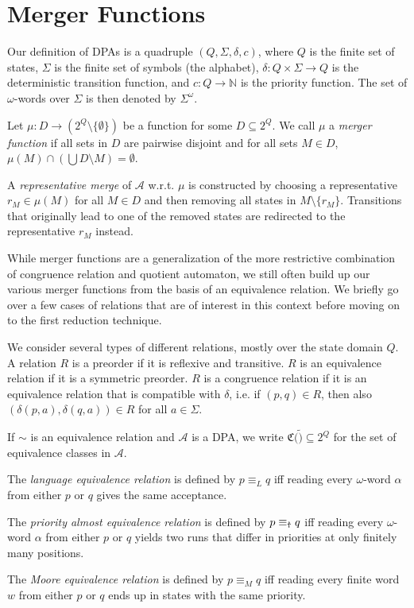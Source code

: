 \section{Merger Functions}
Our definition of DPAs is a quadruple $(Q, \Sigma, \delta, c)$, where $Q$ is the finite set of states, $\Sigma$ is the finite set of symbols (the alphabet), $\delta : Q \times \Sigma \rightarrow Q$ is the deterministic transition function, and $c : Q \rightarrow \mathbb{N}$ is the priority function. The set of $\omega$-words over $\Sigma$ is then denoted by $\Sigma^\omega$.

\begin{definition}
	Let $\mu : D \rightarrow (2^Q \setminus \{\emptyset\})$ be a function for some $D \subseteq 2^Q$. We call $\mu$ a \emph{merger function} if all sets in $D$ are pairwise disjoint and for all sets $M \in D$, $\mu(M) \cap (\bigcup D \setminus M) = \emptyset$.
	
	A \emph{representative merge} of $\mathcal{A}$ w.r.t. $\mu$ is constructed by choosing a representative $r_M \in \mu(M)$ for all $M \in D$ and then removing all states in $M \setminus \{r_M\}$. Transitions that originally lead to one of the removed states are redirected to the representative $r_M$ instead.
\end{definition}

While merger functions are a generalization of the more restrictive combination of congruence relation and quotient automaton, we still often build up our various merger functions from the basis of an equivalence relation. We briefly go over a few cases of relations that are of interest in this context before moving on to the first reduction technique.

We consider several types of different relations, mostly over the state domain $Q$. A relation $R$ is a preorder if it is reflexive and transitive. $R$ is an equivalence relation if it is a symmetric preorder. $R$ is a congruence relation if it is an equivalence relation that is compatible with $\delta$, i.e. if $(p, q) \in R$, then also $(\delta(p, a), \delta(q, a)) \in R$ for all $a \in \Sigma$.

If $\sim$ is an equivalence relation and $\mathcal{A}$ is a DPA, we write $\mathfrak{C}(\tilde) \subseteq 2^Q$ for the set of equivalence classes in $\mathcal{A}$. 

\begin{definition}
	The \emph{language equivalence relation} is defined by $p \equiv_L q$ iff reading every $\omega$-word $\alpha$ from either $p$ or $q$ gives the same acceptance.
	
	The \emph{priority almost equivalence relation} is defined by $p \equiv_\text{\Ankh} q$ iff reading every $\omega$-word $\alpha$ from either $p$ or $q$ yields two runs that differ in priorities at only finitely many positions.
	
	The \emph{Moore equivalence relation} is defined by $p \equiv_M q$ iff reading every finite word $w$ from either $p$ or $q$ ends up in states with the same priority.
\end{definition}

